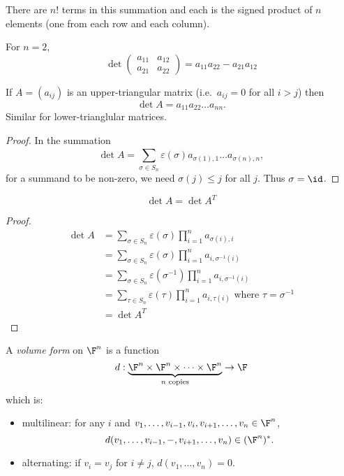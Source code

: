\documentclass[a4paper]{article}
\theoremstyle{definition}
\begin{document}
There are \(n!\) terms in this summation and each is the signed product of \(n\) elements (one from each row and each column).

\begin{eg}
  For \(n = 2\),
  \[
    \det
    \begin{pmatrix}
      a_{11} & a_{12} \\
      a_{21} & a_{22}
    \end{pmatrix}
    =a_{11}a_{22} - a_{21}a_{12}
  \]
\end{eg}

\begin{lemma}
  If \(A = (a_{ij})\) is an upper-triangular matrix (i.e.\ \(a_{ij} = 0\) for all \(i > j\)) then
  \[
    \det A = a_{11}a_{22}\dots a_{nn}.
  \]
  Similar for lower-trianglular matrices.
\end{lemma}

\begin{proof}
  In the summation
  \[
    \det A = \sum_{\sigma \in S_n}^{ }\varepsilon(\sigma) a_{\sigma(1), 1}\dots a_{\sigma(n),n},
  \]
  for a summand to be non-zero, we need \(\sigma(j) \leq j\) for all \(j\). Thus \(\sigma = \id\).
\end{proof}

\begin{lemma}
  \[
    \det A = \det A^T
  \]
\end{lemma}

\begin{proof}
  \begin{align*}
    \det A &= \sum_{\sigma \in S_n}^{ } \varepsilon(\sigma) \prod_{i = 1}^n a_{\sigma(i), i} \\
           &= \sum_{\sigma \in S_n}^{ } \varepsilon(\sigma) \prod_{i = 1}^n a_{i, \sigma^{-1}(i)} \\
           &= \sum_{\sigma \in S_n}^{ } \varepsilon(\sigma^{-1}) \prod_{i = 1}^n a_{i, \sigma^{-1}(i)} \\
           &= \sum_{\tau \in S_n}^{ } \varepsilon(\tau) \prod_{i = 1}^n a_{i, \tau(i)} \text{ where \(\tau = \sigma^{-1}\)} \\
           &= \det A^T
  \end{align*}
\end{proof}

\begin{definition}
  A \emph{volume form} on \(\F^n\) is a function
  \[
    d: \underbrace{\F^n \times \F^n \times \dots \times \F^n}_{\text{\(n\) copies}} \to \F
  \]
  which is:
  \begin{itemize}
  \item multilinear: for any \(i\) and \(v_1, \dots, v_{i-1}, v_i, v_{i + 1}, \dots, v_n \in \F^n\),
    \[
      d(v_1, \dots, v_{i-1}, -, v_{i+1}, \dots, v_n) \in (\F^n)^*.
    \]
  \item alternating: if \(v_i = v_j\) for \(i \neq j\), \(d(v_1, \dots, v_n) = 0\).
  \end{itemize}
\end{definition}
\end{document}
